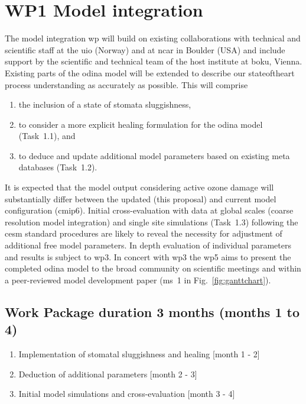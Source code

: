 \section{WP1 Model integration}
\label{sec:wp1}
The model integration \gls{wp} will build on existing collaborations with technical and scientific staff at the \gls{uio} (Norway) and at \gls{ncar} in Boulder (USA) and include support by the scientific and technical team of the host institute at \gls{boku}, Vienna. Existing parts of the \gls{odina} model will be extended to describe our stateoftheart process understanding as accurately as possible. This will comprise
\begin{enumerate}
  \itemsep0pt
\item the inclusion of a state of stomata sluggishness,
\item to  consider a more explicit healing formulation for the \gls{odina} model (Task~1.1),  and
\item to deduce and update additional model parameters based on existing meta databases (Task~1.2).
\end{enumerate}
It is expected that the model output considering  active ozone damage will substantially differ between the updated (this proposal) and current model configuration (\gls{cmip}6). Initial cross-evaluation with data at global scales (coarse resolution model integration) and single site simulations (Task~1.3) following the \gls{cesm} standard procedures are likely to reveal the necessity for adjustment of additional free model parameters. In depth evaluation of individual parameters and results is subject to \gls{wp}3. In concert with \gls{wp}3 the \gls{wp}5 aims to present the  completed \gls{odina} model to the broad community on scientific meetings and within  a peer-reviewed model development paper (\gls{ms}~1 in Fig.~\ref{fig:ganttchart}).
\subsection*{Work Package duration 3 months (months 1 to 4)}
\begin{enumerate}[start=1,label={T1.\arabic*}]
  \itemsep0pt
\item Implementation of stomatal sluggishness and healing \hfill [month 1 - 2]
\item Deduction of additional parameters \hfill [month 2 - 3]
\item Initial model simulations and cross-evaluation \hfill [month 3 - 4]
\end{enumerate}

